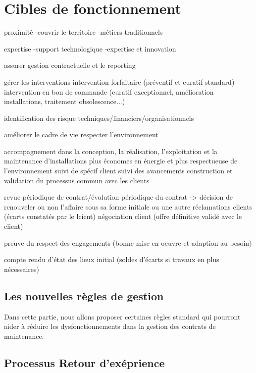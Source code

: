 \chapter{Cibles de fonctionnement}

proximité
-couvrir le territoire
-métiers traditionnels

expertise
-support technologique
-expertise et innovation

assurer gestion contractuelle et le reporting

gérer les interventions
intervention forfaitaire (préventif et curatif standard)
intervention en bon de commande (curatif exceptionnel, amélioration installations, traitement obsolescence...)

identification des risque techniques/financiers/organisationnels

améliorer le cadre de vie
respecter l'environnement

accompagnement dans la conception, la réalisation, l'exploitation et la maintenance d'installations plus économes en énergie et plus respectueuse de l'environnement
suivi de spécif client
suivi des avancements
construction et validation du processus commun avec les clients

revue périodique de contrat/évolution périodique du contrat -> décision de renouveler ou non l'affaire sous sa forme initiale ou une autre
réclamations clients (écarts constatés par le lcient)
négociation client (offre définitive validé avec le client)

preuve du respect des engagements (bonne mise en oeuvre et adaption au besoin)

compte rendu d'état des lieux initial (soldes d'écarts si travaux en plus nécessaires)


\section{Les nouvelles règles de gestion}
Dans cette partie, nous allons proposer certaines règles standard qui pourront aider à réduire les dysfonctionnements dans la gestion des contrats de maintenance.



\section{Processus Retour d'exéprience}

